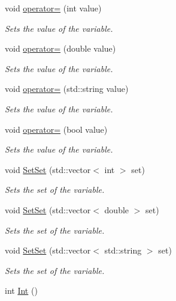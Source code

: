 \begin{DoxyCompactItemize}
void \hyperlink{structostendo_1_1Var_a89b2842e7aad2fdf3ae21070655bb436}{operator=} (int value)
\begin{DoxyCompactList}\small\item\em Sets the value of the variable. \end{DoxyCompactList}\item 
void \hyperlink{structostendo_1_1Var_a828c7ab4e4b53030cea5e94aa34d84d5}{operator=} (double value)
\begin{DoxyCompactList}\small\item\em Sets the value of the variable. \end{DoxyCompactList}\item 
void \hyperlink{structostendo_1_1Var_a5f9e9d7249cd02d28765d21bf3a80fe5}{operator=} (std\+::string value)
\begin{DoxyCompactList}\small\item\em Sets the value of the variable. \end{DoxyCompactList}\item 
void \hyperlink{structostendo_1_1Var_a33de8632f442f7751af96d471dae1321}{operator=} (bool value)
\begin{DoxyCompactList}\small\item\em Sets the value of the variable. \end{DoxyCompactList}\item 
void \hyperlink{structostendo_1_1Var_a16f5d751d92892e903d3631707fd5ea0}{Set\+Set} (std\+::vector$<$ int $>$ set)
\begin{DoxyCompactList}\small\item\em Sets the set of the variable. \end{DoxyCompactList}\item 
void \hyperlink{structostendo_1_1Var_a796286e938479ad4d3194915a702defa}{Set\+Set} (std\+::vector$<$ double $>$ set)
\begin{DoxyCompactList}\small\item\em Sets the set of the variable. \end{DoxyCompactList}\item 
void \hyperlink{structostendo_1_1Var_aaa2ebfdc3a5099f234fe105a040cafca}{Set\+Set} (std\+::vector$<$ std\+::string $>$ set)
\begin{DoxyCompactList}\small\item\em Sets the set of the variable. \end{DoxyCompactList}\item 
int \hyperlink{structostendo_1_1Var_a8112500b840ee7aaee88aeeca6fec4c0}{Int} ()\hypertarget{structostendo_1_1Var_a8112500b840ee7aaee88aeeca6fec4c0}{}\label{structostendo_1_1Var_a8112500b840ee7aaee88aeeca6fec4c0}


\end{DoxyCompactItemize}
